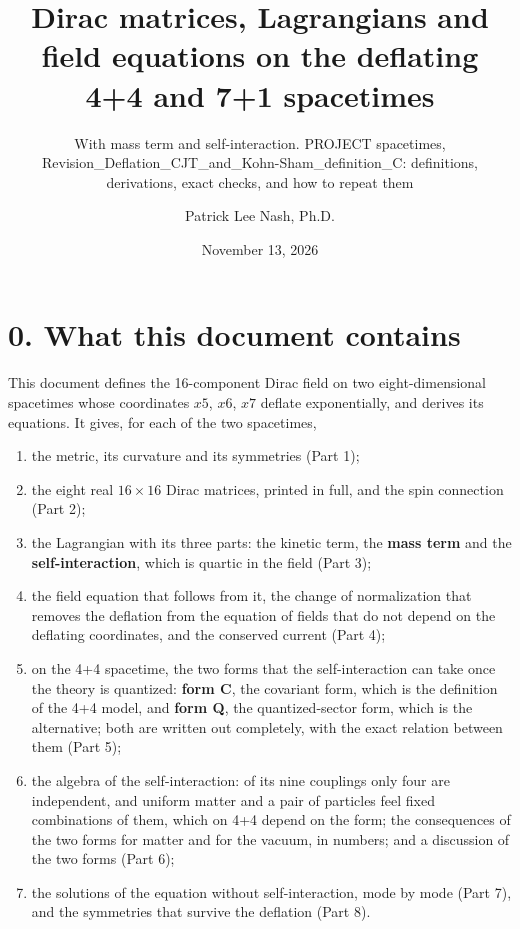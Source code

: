 \documentclass[
  10pt,
]{article}
\title{Dirac matrices, Lagrangians and field equations on the deflating
4+4 and 7+1 spacetimes}
\subtitle{With mass term and self-interaction. PROJECT spacetimes,
Revision\_Deflation\_CJT\_and\_Kohn-Sham\_definition\_C: definitions,
derivations, exact checks, and how to repeat them}
\author{Patrick Lee Nash, Ph.D.}
\date{November 13, 2026}
\providecommand{\tightlist}{%
  \setlength{\itemsep}{0pt}\setlength{\parskip}{0pt}}
\begin{document}
\maketitle

\hypertarget{what-this-document-contains}{%
\section{0. What this document
contains}\label{what-this-document-contains}}

This document defines the 16-component Dirac field on two
eight-dimensional spacetimes whose coordinates \(x5\), \(x6\), \(x7\)
deflate exponentially, and derives its equations. It gives, for each of
the two spacetimes,

\begin{enumerate}
\def\labelenumi{\arabic{enumi}.}
\tightlist
\item
  the metric, its curvature and its symmetries (Part 1);
\item
  the eight real \(16\times16\) Dirac matrices, printed in full, and the
  spin connection (Part 2);
\item
  the Lagrangian with its three parts: the kinetic term, the
  \textbf{mass term} and the \textbf{self-interaction}, which is quartic
  in the field (Part 3);
\item
  the field equation that follows from it, the change of normalization
  that removes the deflation from the equation of fields that do not
  depend on the deflating coordinates, and the conserved current (Part
  4);
\item
  on the 4+4 spacetime, the two forms that the self-interaction can take
  once the theory is quantized: \textbf{form C}, the covariant form,
  which is the definition of the 4+4 model, and \textbf{form Q}, the
  quantized-sector form, which is the alternative; both are written out
  completely, with the exact relation between them (Part 5);
\item
  the algebra of the self-interaction: of its nine couplings only four
  are independent, and uniform matter and a pair of particles feel fixed
  combinations of them, which on 4+4 depend on the form; the
  consequences of the two forms for matter and for the vacuum, in
  numbers; and a discussion of the two forms (Part 6);
\item
  the solutions of the equation without self-interaction, mode by mode
  (Part 7), and the symmetries that survive the deflation (Part 8).
\end{enumerate}
\end{document}
